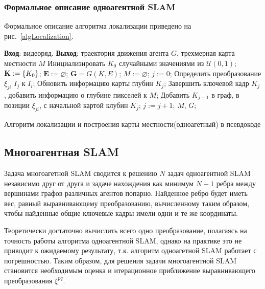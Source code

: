 \subsubsection{Формальное описание одноагентной SLAM}
Формальное описание алгоритма локализации приведено на рис.~\ref{algLocalization}.
\begin{algorithm}[H]
        \begin{algorithmic}[1]
            \State \textbf{Вход}: видеоряд.
            \State \textbf{Выход}: траектория движения агента $G$, трехмерная карта местности $M$
            \State Инициализировать $K_0$ случайными значениями из $\mathcal{U}(0,1)$;
            \State $\mathbf{K} := \{ K_0 \}$; $\mathbf{E} := \varnothing$; $\mathbf{G} = G(K, E)$; $M := \varnothing$; $j := 0$;
                \State Определить преобразование $\xi_{ji}$ $I_j$ к $I_i$;
                    \State Обновить информацию карты глубин $K_j$;
                \Else
                    \State Завершить ключевой кадр $K_j$, добавить информацию о глубине пикселей к $M$;
                    \State Добавить $K_{j+1}$ в граф, в позиции $\xi_{ji}$, с начальной картой клубин $K_j$;
                    \State $j := j + 1$;
                \EndIf
            \EndFor
            \State \Return $M$, $G$;
        \end{algorithmic}
    \caption{Алгоритм локализации и построения карты местности(одноагетный) в псевдокоде}
    \label{algLocalization}
\end{algorithm}

\subsection{Многоагентная SLAM}
Задача многоагетной SLAM сводится к решению $N$ задач одноагентной SLAM независимо друг от друга и задаче нахождения как минимум $N-1$ ребра между вершинами графов различных агентов попарно. Найденное ребро будет иметь вес, равный выравнивающему преобразованию, вычисленному таким образом, чтобы найденные общие ключевые кадры имели одни и те же координаты.


Теоретически достаточно вычислить всего одно преобразование, полагаясь на точность работы алгоритма одноагентной SLAM, однако на практике это не приводит к ожидаемому результату, т.к. алгоритм одноагетной SLAM работает с погрешностью. Таким образом, для решения задачи многоагентной SLAM становится необходимым оценка и итерационное приближение выравнивающего преобразования $\xi^{pq}$.



